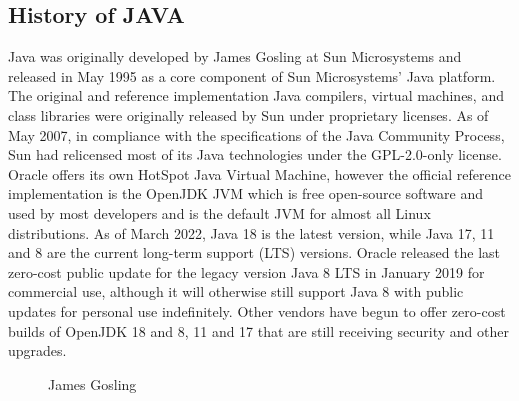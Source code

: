 \documentclass[openany]{book}  %
\begin{document}
\begin{flushleft}
    \chapter{History of JAVA}
    Java\cite{Ref1} was originally developed by James Gosling\cite{Ref2}  at Sun Microsystems and released in May 1995 as a core component of Sun Microsystems' Java platform.
    The original and reference implementation Java compilers, virtual machines, and class libraries were originally released by Sun under proprietary licenses.
    As of May 2007, in compliance with the specifications of the Java Community Process, Sun had relicensed most of its Java technologies under the GPL-2.0-only license.
    Oracle offers its own HotSpot Java Virtual Machine, however the official reference implementation is the OpenJDK JVM which is free open-source software and used by most developers
    and is the default JVM for almost all Linux distributions.
    \linebreak
    \linebreak
    As of March 2022, Java 18 is the latest version, while Java 17, 11 and 8 are the current long-term support (LTS) versions.
    Oracle released the last zero-cost public update for the legacy version Java 8 LTS in January 2019 for commercial use,
    although it will otherwise still support Java 8 with public updates for personal use indefinitely.
    Other vendors have begun to offer zero-cost builds of OpenJDK 18 and 8, 11 and 17 that are still receiving security and other upgrades.


    \begin{figure}[htbp]
        \begin{center}
            \caption{James Gosling\cite{Ref2}}
        \end{center}
    \end{figure}



\end{flushleft}
\end{document}
